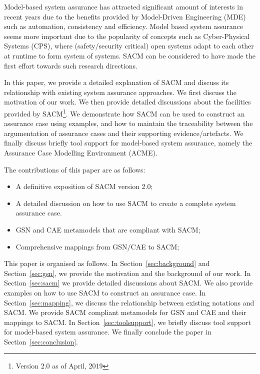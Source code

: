 Model-based system assurance has attracted significant amount of interests in recent years due to the benefits provided by Model-Driven Engineering (MDE) such as automation, consistency and efficiency. 
Model based system assurance seems more important due to the popularity of concepts such as Cyber-Physical Systems (CPS), where (safety/security critical) open systems adapt to each other at runtime to form system of systems. 
SACM can be considered to have made the first effort towards such research directions.


In this paper, we provide a detailed explanation of SACM and discuss its relationship with existing system assurance approaches. 
We first discuss the motivation of our work. 
We then provide detailed discussions about the facilities provided by SACM\footnote{Version 2.0 as of April, 2019}. 
We demonstrate how SACM can be used to construct an assurance case using examples, and how to maintain the traceability between the argumentation of assurance cases and their supporting evidence/artefacts. 
We finally discuss briefly tool support for model-based system assurance, namely the Assurance Case Modelling Environment (ACME).

The contributions of this paper are as follows:
\begin{itemize}
	\item A definitive exposition of SACM version 2.0;
	\item A detailed discussion on how to use SACM to create a complete system assurance case.
	\item GSN and CAE metamodels that are compliant with SACM;
	\item Comprehensive mappings from GSN/CAE to SACM;
\end{itemize}

This paper is organised as follows. 
In Section~\ref{sec:background} and Section~\ref{sec:gsn}, we provide the motivation and the background of our work. 
In Section~\ref{sec:sacm} we provide detailed discussions about SACM. 
We also provide examples on how to use SACM to construct an assurance case. 
In Section~\ref{sec:mapping}, we discuss the relationship between existing notations and SACM. 
We provide SACM compliant metamodels for GSN and CAE and their mappings to SACM. 
In Section~\ref{sec:toolsupport}, we briefly discuss tool support for model-based system assurance. 
We finally conclude the paper in Section~\ref{sec:conclusion}.


